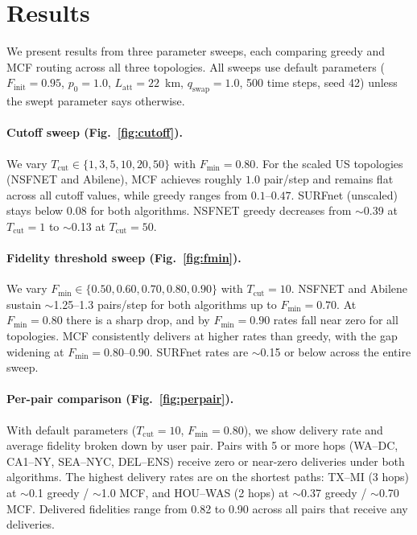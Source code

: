 \section{Results}
\label{sec:results}

We present results from three parameter sweeps, each comparing greedy and MCF routing across all three topologies. All sweeps use default parameters ($F_\text{init} = 0.95$, $p_0 = 1.0$, $L_\text{att} = 22$~km, $q_\text{swap} = 1.0$, 500 time steps, seed 42) unless the swept parameter says otherwise.

\paragraph{Cutoff sweep (Fig.~\ref{fig:cutoff}).} We vary $T_\text{cut} \in \{1, 3, 5, 10, 20, 50\}$ with $F_\text{min} = 0.80$. For the scaled US topologies (NSFNET and Abilene), MCF achieves roughly $1.0$ pair/step and remains flat across all cutoff values, while greedy ranges from $0.1$--$0.47$. SURFnet (unscaled) stays below $0.08$ for both algorithms. NSFNET greedy decreases from $\sim$0.39 at $T_\text{cut} = 1$ to $\sim$0.13 at $T_\text{cut} = 50$.

\paragraph{Fidelity threshold sweep (Fig.~\ref{fig:fmin}).} We vary $F_\text{min} \in \{0.50, 0.60, 0.70, 0.80, 0.90\}$ with $T_\text{cut} = 10$. NSFNET and Abilene sustain $\sim$1.25--1.3 pairs/step for both algorithms up to $F_\text{min} = 0.70$. At $F_\text{min} = 0.80$ there is a sharp drop, and by $F_\text{min} = 0.90$ rates fall near zero for all topologies. MCF consistently delivers at higher rates than greedy, with the gap widening at $F_\text{min} = 0.80$--$0.90$. SURFnet rates are $\sim$0.15 or below across the entire sweep.

\paragraph{Per-pair comparison (Fig.~\ref{fig:perpair}).} With default parameters ($T_\text{cut} = 10$, $F_\text{min} = 0.80$), we show delivery rate and average fidelity broken down by user pair. Pairs with 5 or more hops (WA--DC, CA1--NY, SEA--NYC, DEL--ENS) receive zero or near-zero deliveries under both algorithms. The highest delivery rates are on the shortest paths: TX--MI (3 hops) at $\sim$0.1 greedy / $\sim$1.0 MCF, and HOU--WAS (2 hops) at $\sim$0.37 greedy / $\sim$0.70 MCF. Delivered fidelities range from 0.82 to 0.90 across all pairs that receive any deliveries.
